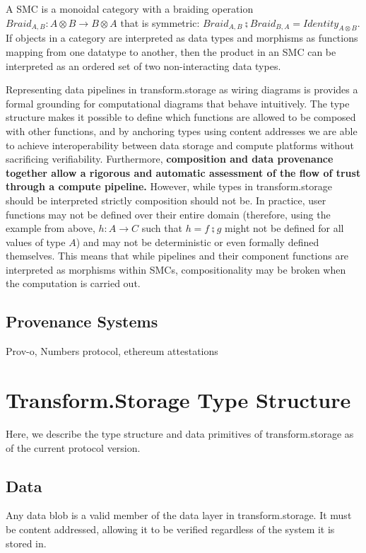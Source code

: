 \documentclass[9pt, oneside]{article}   	%
\begin{document}
\begin{multicols}{2}
A SMC is a monoidal category with a braiding operation $Braid_{A,B} : A \otimes B \rightarrow B \otimes A$ that is symmetric: $Braid_{A,B} \zcmp Braid_{B,A}=Identity_{A \otimes B}$. If objects in a category are interpreted as data types and morphisms as functions mapping from one datatype to another, then the product in an SMC can be interpreted as an ordered set of two non-interacting data types. 

Representing data pipelines in transform.storage as wiring diagrams is provides a formal grounding for computational diagrams that behave intuitively. The type structure makes it possible to define which functions are allowed to be composed with other functions, and by anchoring types using content addresses we are able to achieve interoperability between data storage and compute platforms without sacrificing verifiability. Furthermore, \textbf{composition and data provenance together allow a rigorous and automatic assessment of the flow of trust through a compute pipeline.}  However, while types in transform.storage should be interpreted strictly composition should not be. In practice, user functions may not be defined over their entire domain (therefore, using the example from above, $h : A \rightarrow C$ such that $h = f \zcmp g$ might not be defined for all values of type $A$) and may not be deterministic or even formally defined themselves. This means that while pipelines and their component functions are interpreted as morphisms within SMCs, compositionality may be broken when the computation is carried out. 


\subsection{Provenance Systems}\label{smc}
Prov-o, Numbers protocol, ethereum attestations 

\section{Transform.Storage Type Structure}\label{transformtypes}

Here, we describe the type structure and data primitives of transform.storage as of the current protocol version.

\subsection{Data}\label{data}

Any data blob is a valid member of the data layer in transform.storage. It must be content addressed, allowing it to be verified regardless of the system it is stored in.


\end{multicols}
\end{document}
